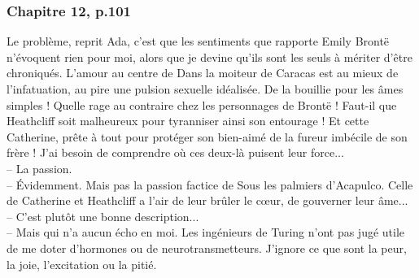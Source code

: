 \documentclass{article}
\begin{document}
			\subsubsection{Chapitre 12, p.101}\label{ada_phenomenologie}
				Le	 problème,	 reprit	 Ada,	 c'est	 que	 les	 sentiments	 que rapporte Emily	Brontë n'évoquent	rien	pour	moi,	alors	que	je	devine	qu'ils	sont	les
				seuls	à	mériter	d'être	chroniqués.	L'amour	au	centre	de	Dans	la	moiteur	de
				Caracas	 est	 au	 mieux	 de	 l'infatuation,	 au	 pire	 une	 pulsion	 sexuelle
				idéalisée.	 De	 la	 bouillie	 pour	 les	 âmes	 simples	 !	 Quelle	 rage	 au	 contraire
				chez	 les	 personnages	 de	 Brontë	 !	 Faut-il	 que	 Heathcliff	 soit	 malheureux
				pour	tyranniser	ainsi	son	entourage	!	Et	cette	Catherine,	prête	à	tout	pour
				protéger	son	bien-aimé	de	la	fureur	imbécile	de	son	frère	!	J'ai	besoin	de
				comprendre	où	ces	deux-là	puisent	leur	force...\\
				--	La	passion.\\
				--	 Évidemment.	 Mais	 pas	 la	 passion	 factice	 de	 Sous	 les	 palmiers
				d'Acapulco.	Celle	de	Catherine	et	Heathcliff	a	l'air	de	leur	brûler	le	cœur,
				de	gouverner	leur	âme...\\
				--	C'est	plutôt	une	bonne	description...\\
				--	Mais	qui	n'a	aucun	écho	en	moi.	Les	ingénieurs	de	Turing	n'ont	pas
				jugé	utile	de	me	doter	d'hormones	ou	de	neurotransmetteurs.	J'ignore	ce
				que	sont	la	peur,	la	joie,	l'excitation	ou	la	pitié.
\end{document}
